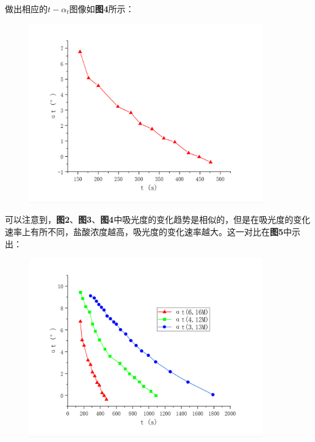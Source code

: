 \documentclass[12pt]{article}
\begin{document}
			做出相应的$t-\alpha_{t}$图像如\textbf{图4}所示：
			\begin{figure}[!h]
				\centering
				\includegraphics[width=0.90\textwidth]{4.png}
			\end{figure}
			\par
			可以注意到，\textbf{图2}、\textbf{图3}、\textbf{图4}中吸光度的变化趋势是相似的，但是在吸光度的变化速率上有所不同，盐酸浓度越高，吸光度的变化速率越大。这一对比在\textbf{图5}中示出：\par
			\begin{figure}[!h]
				\centering
				\includegraphics[width=0.90\textwidth]{5.png}
			\end{figure}
			\par
\end{document}
